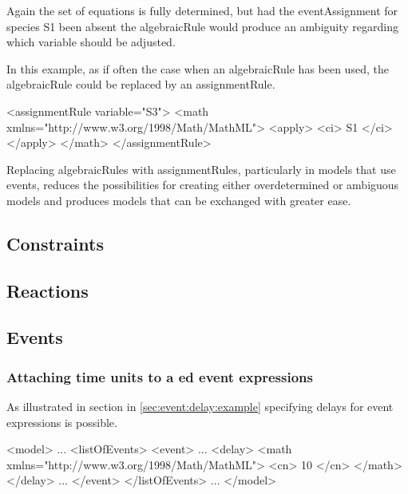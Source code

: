 Again the set of equations is fully determined, but had the eventAssignment for
species S1 been absent the algebraicRule would produce an ambiguity regarding
which variable should be adjusted.  

In this example, as if often the case
when an algebraicRule has been used, the algebraicRule could be replaced by an
assignmentRule.

\begin{example}
<assignmentRule variable="S3">
    <math xmlns="http://www.w3.org/1998/Math/MathML">
        <apply>
            <ci> S1 </ci>
        </apply>
    </math>
</assignmentRule>
\end{example}

Replacing algebraicRules with assignmentRules, particularly in models that
use events, reduces the possibilities for creating either overdetermined or
ambiguous models and produces models that can be exchanged with greater ease.


 





\subsection{Constraints}
\label{sec:bp:constraints}


\subsection{Reactions}
\label{sec:bp:reactions}


\subsection{Events}
\label{sec:bp:events}

\subsubsection{Attaching time units to a ed event expressions}
\label{sec:bp:event:delay}

As illustrated in section in \ref{sec:event:delay:example}  specifying delays for 
event expressions is possible. 

\begin{example}
<model>
    ...
    <listOfEvents>
        <event>
            ...
            <delay>
                <math xmlns="http://www.w3.org/1998/Math/MathML">
                    <cn> 10 </cn>
                </math>
            </delay>
            ...
        </event>
    </listOfEvents>
    ...
</model>
\end{example}

